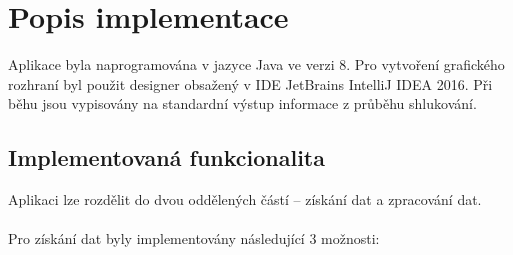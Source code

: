 \documentclass[pdftex,a4paper]{article}
\begin{document}
\newpage

\section{Popis implementace}
Aplikace byla naprogramována v jazyce Java ve verzi 8. Pro vytvoření grafického rozhraní byl použit designer obsažený v IDE JetBrains IntelliJ IDEA 2016. Při běhu jsou vypisovány na standardní výstup informace z průběhu shlukování.



\subsection{Implementovaná funkcionalita}
\noindent
Aplikaci lze rozdělit do dvou oddělených částí -- získání dat a zpracování dat.\\\\
\noindent
Pro získání dat byly implementovány následující 3 možnosti:
\end{document}
